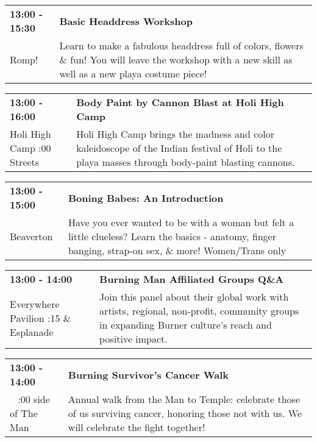 \begin{tabular}{ p{1in} p{2.2in} }
    \textbf{13:00 - 15:30} & \textbf{Basic Headdress Workshop} \\
    Romp! \newline  & Learn to make a fabulous headdress full of colors, flowers \& fun!  You will leave the workshop with a new skill as well as a new playa costume piece! \\
    \hline 
\end{tabular}
    
\begin{tabular}{ p{1in} p{2.2in} }
    \textbf{13:00 - 16:00} & \textbf{Body Paint by Cannon Blast at Holi High Camp} \\
    Holi High Camp \newline 3:00 Streets & Holi High Camp brings the madness and color kaleidoscope of the Indian festival of Holi to the playa masses through body-paint blasting cannons. \\
    \hline 
\end{tabular}
    
\begin{tabular}{ p{1in} p{2.2in} }
    \textbf{13:00 - 15:00} & \textbf{Boning Babes: An Introduction} \\
    Beaverton \newline  & Have you ever wanted to be with a woman but felt a little clueless? Learn the basics - anatomy, finger banging, strap-on sex, \& more! Women/Trans only \\
    \hline 
\end{tabular}
    
\begin{tabular}{ p{1in} p{2.2in} }
    \textbf{13:00 - 14:00} & \textbf{Burning Man Affiliated Groups Q\&A} \\
    Everywhere Pavilion \newline 6:15 \& Esplanade & Join this panel about their global work with artists, regional, non-profit, community groups in expanding Burner culture's reach and positive impact. \\
    \hline 
\end{tabular}
    
\begin{tabular}{ p{1in} p{2.2in} }
    \textbf{13:00 - 14:00} & \textbf{Burning Survivor's Cancer Walk} \\
    ~ \newline 12:00 side of The Man & Annual walk from the Man to Temple: celebrate those of us surviving cancer, honoring those not with us. We will celebrate the fight together! \\
    \hline 
\end{tabular}
    
